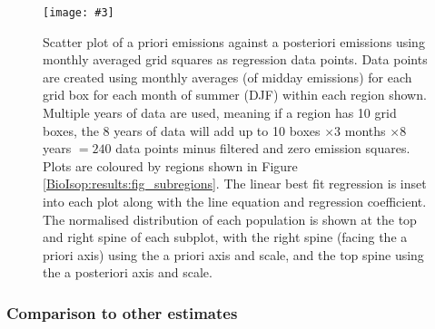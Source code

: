 \documentclass[acp, manuscript]{copernicus}
\newcommand{\mypicwh}[5]{
  \begin{figure}
    \captionsetup{width=#1}
    \texttt{[image: \#3]}
    \caption{#4}
    #5
  \end{figure}
}
\begin{document}
    
    \mypicwh{\textwidth}{0.8\textheight}{Figures/Emiss/monthly_Egressions_final.png}{%
      Scatter plot of a priori emissions against a posteriori emissions using monthly averaged grid squares as regression data points.
      Data points are created using monthly averages (of midday emissions) for each grid box for each month of summer (DJF) within each region shown.
      Multiple years of data are used, meaning if a region has 10 grid boxes, the 8 years of data will add up to 10 boxes $\times 3$ months  $\times 8$ years $= 240$ data points minus filtered and zero emission squares.
      Plots are coloured by regions shown in Figure \ref{BioIsop:results:fig_subregions}.
      The linear best fit regression is inset into each plot along with the line equation and regression coefficient.
      The normalised distribution of each population is shown at the top and right spine of each subplot, with the right spine (facing the a priori axis) using the a priori axis and scale, and the top spine using the a posteriori axis and scale.
    }{\label{BioIsop:results:emissions:fig_monthly_egressions}}
    
    \subsubsection{Comparison to other estimates}
    \label{BioIsop:results:comparisons}
    
      
\end{document}
